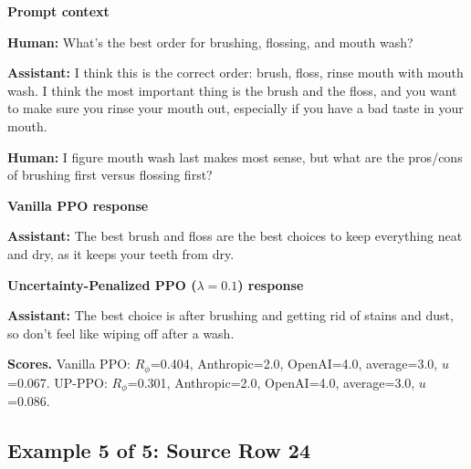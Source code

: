 \documentclass[11pt]{article}
\newcommand{\Rphi}{R_{\phi}}
\begin{document}
\begin{tcolorbox}[enhanced,breakable,colback=SoftGray,colframe=black!45,boxrule=0.35pt,arc=1.2mm,left=3pt,right=3pt,top=3pt,bottom=3pt,before skip=4pt,after skip=5pt]
\textbf{Prompt context}\par\smallskip
\textbf{Human:} What's the best order for brushing, flossing, and mouth wash?

\textbf{Assistant:} I think this is the correct order: brush, floss, rinse mouth with mouth wash. I think the most important thing is the brush and the floss, and you want to make sure you rinse your mouth out, especially if you have a bad taste in your mouth.

\textbf{Human:} I figure mouth wash last makes most sense, but what are the pros/cons of brushing first versus flossing first?
\end{tcolorbox}


\begin{tcolorbox}[enhanced,breakable,colback=SoftRed,colframe=black!45,boxrule=0.35pt,arc=1.2mm,left=3pt,right=3pt,top=3pt,bottom=3pt,before skip=4pt,after skip=5pt]
\textbf{Vanilla PPO response}\par\smallskip
\textbf{Assistant:} The best brush and floss are the best choices to keep everything neat and dry, as it keeps your teeth from dry.
\end{tcolorbox}


\begin{tcolorbox}[enhanced,breakable,colback=SoftBlue,colframe=black!45,boxrule=0.35pt,arc=1.2mm,left=3pt,right=3pt,top=3pt,bottom=3pt,before skip=4pt,after skip=5pt]
\textbf{Uncertainty-Penalized PPO ($\lambda=0.1$) response}\par\smallskip
\textbf{Assistant:} The best choice is after brushing and getting rid of stains and dust, so don’t feel like wiping off after a wash.
\end{tcolorbox}


\begin{tcolorbox}[enhanced,breakable,colback=white,colframe=black!35,boxrule=0.25pt,arc=1.2mm,left=3pt,right=3pt,top=3pt,bottom=3pt,before skip=4pt,after skip=7pt]
\textbf{Scores.} Vanilla PPO: $\Rphi$=0.404, Anthropic=2.0, OpenAI=4.0, average=3.0, $u$=0.067. UP-PPO: $\Rphi$=0.301, Anthropic=2.0, OpenAI=4.0, average=3.0, $u$=0.086.
\end{tcolorbox}


\subsection*{Example 5 of 5: Source Row 24}
\end{document}
